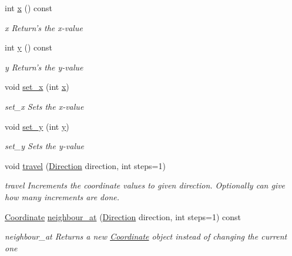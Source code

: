 \begin{DoxyCompactItemize}
int \hyperlink{classCourse_1_1Coordinate_a9f680313ef06841f93bd2529dec3ca6b}{x} () const 
\begin{DoxyCompactList}\small\item\em x Return's the x-\/value \end{DoxyCompactList}\item 
int \hyperlink{classCourse_1_1Coordinate_aa5bbd123925fc7af30d61b4f11a249d1}{y} () const 
\begin{DoxyCompactList}\small\item\em y Return's the y-\/value \end{DoxyCompactList}\item 
void \hyperlink{classCourse_1_1Coordinate_a077dc894b96ff793ede666ca3b4c6dc2}{set\-\_\-x} (int \hyperlink{classCourse_1_1Coordinate_a9f680313ef06841f93bd2529dec3ca6b}{x})
\begin{DoxyCompactList}\small\item\em set\-\_\-x Sets the x-\/value \end{DoxyCompactList}\item 
void \hyperlink{classCourse_1_1Coordinate_a0308c942bb50d59a216877be0be2599b}{set\-\_\-y} (int \hyperlink{classCourse_1_1Coordinate_aa5bbd123925fc7af30d61b4f11a249d1}{y})
\begin{DoxyCompactList}\small\item\em set\-\_\-y Sets the y-\/value \end{DoxyCompactList}\item 
void \hyperlink{classCourse_1_1Coordinate_aafa8af9f2c02d52783125ec0cb995afc}{travel} (\hyperlink{namespaceCourse_aad6b2bd7587f1ac9c29b6693cc653931}{Direction} direction, int steps=1)
\begin{DoxyCompactList}\small\item\em travel Increments the coordinate values to given direction. Optionally can give how many increments are done. \end{DoxyCompactList}\item 
\hyperlink{classCourse_1_1Coordinate}{Coordinate} \hyperlink{classCourse_1_1Coordinate_acb85bffdc4849e12e955072c3d52b9f8}{neighbour\-\_\-at} (\hyperlink{namespaceCourse_aad6b2bd7587f1ac9c29b6693cc653931}{Direction} direction, int steps=1) const 
\begin{DoxyCompactList}\small\item\em neighbour\-\_\-at Returns a new \hyperlink{classCourse_1_1Coordinate}{Coordinate} object instead of changing the current one \end{DoxyCompactList}\item 

\end{DoxyCompactItemize}
